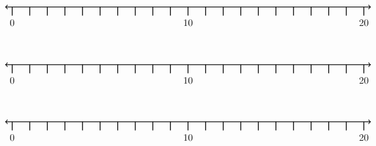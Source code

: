 \documentclass[leqno, 12pt]{article}
\begin{document}
\vspace{10pt}\begin{equation}
    \begin{tikzpicture}[scale=0.75, baseline={([yshift=-1pt]current bounding box.north)}]
        \draw[{To[scale=1.3]}-{To[scale=1.3]}, line width=1pt] (-0.4, 0) -- (20.4, 0);
        \foreach \x in {0,1,...,20}
            \draw[shift={(\x,0)},color=black, line width=1pt] (0pt,-14pt) -- (0pt,0pt);
        \foreach \x in {0,10,20}
            \draw[shift={(\x,-0.8)},color=black] node[font=\large,text height=12pt] {$\x$};
        \node [font=\large, minimum width=30mm] at (21,1.2) {$  $};
    \end{tikzpicture}
\end{equation}
\vspace{10pt}\begin{equation}
    \begin{tikzpicture}[scale=0.75, baseline={([yshift=-1pt]current bounding box.north)}]
        \draw[{To[scale=1.3]}-{To[scale=1.3]}, line width=1pt] (-0.4, 0) -- (20.4, 0);
        \foreach \x in {0,1,...,20}
            \draw[shift={(\x,0)},color=black, line width=1pt] (0pt,-14pt) -- (0pt,0pt);
        \foreach \x in {0,10,20}
            \draw[shift={(\x,-0.8)},color=black] node[font=\large,text height=12pt] {$\x$};
        \node [font=\large, minimum width=30mm] at (21,1.2) {$  $};
    \end{tikzpicture}
\end{equation}
\vspace{10pt}\begin{equation}
    \begin{tikzpicture}[scale=0.75, baseline={([yshift=-1pt]current bounding box.north)}]
        \draw[{To[scale=1.3]}-{To[scale=1.3]}, line width=1pt] (-0.4, 0) -- (20.4, 0);
        \foreach \x in {0,1,...,20}
            \draw[shift={(\x,0)},color=black, line width=1pt] (0pt,-14pt) -- (0pt,0pt);
        \foreach \x in {0,10,20}
            \draw[shift={(\x,-0.8)},color=black] node[font=\large,text height=12pt] {$\x$};
        \node [font=\large, minimum width=30mm] at (21,1.2) {$  $};
    \end{tikzpicture}
\end{equation}
\end{document}
